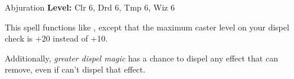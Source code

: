 {Abjuration}
{
	\textbf{Level:}
	Clr 6, Drd 6, Tmp 6, Wiz 6\\
}
{
	This spell functions like , except that the maximum caster level on your dispel check is +20 instead of +10.

	Additionally, \emph{greater dispel magic} has a chance to dispel any effect that  can remove, even if  can't dispel that effect.

}
